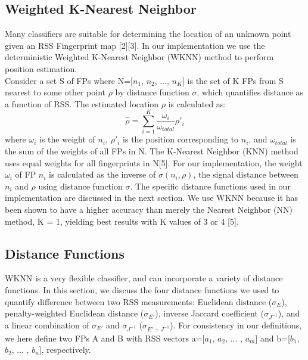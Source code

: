 \documentclass[twoside]{article}
\begin{document}
\begin{multicols}{2}
\subsection{Weighted K-Nearest Neighbor}

\indent Many classifiers are suitable for determining the location of an unknown point given an RSS Fingerprint map [2][3]. In our implementation we use the deterministic Weighted K-Nearest Neighbor (WKNN) method to perform position estimation.\\
\indent Consider a set S of FPs  where N=[$n_1$, $n_2$, ..., $n_K$] is the set of K FPs from S nearest to some other point $\rho$ by distance function $\sigma$, which quantifies distance as a function of RSS. The estimated location $\rho$ is calculated as:
\begin{equation}
\label{wknn}
\hat{\rho} = \sum\limits_{i=1}^{K}\frac{\omega_i}{\omega_{total}}\rho'_i
\end{equation}
\indent where $\omega_i$ is the weight of $n_i$, $\rho'_i$ is the position corresponding to $n_i$, and $\omega_{total}$ is the sum of the weights of all FPs in N. The K-Nearest Neighbor (KNN) method uses equal weights for all fingerprints in N[5]. For our implementation, the weight $\omega_i$ of FP $n_i$ is calculated as the inverse of $\sigma(n_i, \rho)$, the signal distance between $n_i$ and $\rho$ using distance function $\sigma$. The specific distance functions used in our implementation are discussed in the next section. We use WKNN because it has been shown to have a higher accuracy than merely the Nearest Neighbor (NN) method, K = 1, yielding best results with K values of 3 or 4 [5]. 
	
\subsection{Distance Functions}

\indent WKNN is a very flexible classifier, and can incorporate a variety of distance functions. In this section, we discuss the four distance functions we used to quantify difference between two RSS measurements: Euclidean distance ($\sigma_E$), penalty-weighted Euclidean distance ($\sigma_{E'}$), inverse Jaccard coefficient ($\sigma_{J^{-1}}$), and a linear combination of $\sigma_{E'}$ and $\sigma_{J^{-1}}$ ($\sigma_{E' + J^{-1}}$). For consistency in our definitions, we here define two FPs A and B with RSS vectors a=[$a_1$, $a_2$, ... , $a_m$] and b=[$b_1$, $b_2$, ... , $b_n$], respectively. 



\end{multicols}
\end{document}
